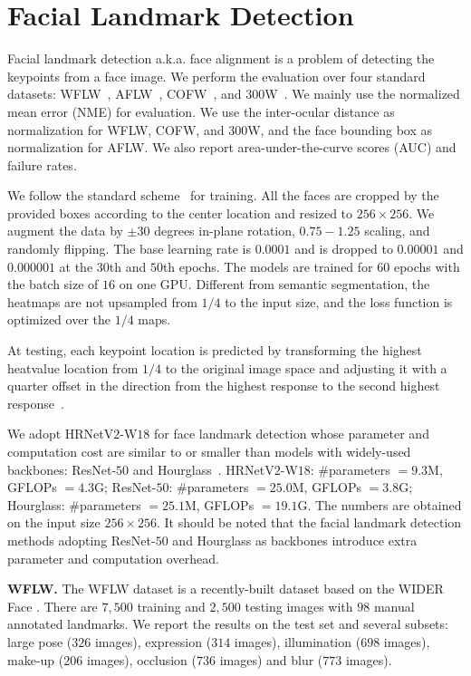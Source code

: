 \documentclass[10pt,journal,compsoc]{IEEEtran}
\begin{document}
\clearpage

\section{Facial Landmark Detection}
Facial landmark detection
a.k.a. face alignment
is a problem of detecting the keypoints
from a face image.
We perform the evaluation over 
four standard datasets:
WFLW~\cite{Wu0YWC018},
AFLW~\cite{KostingerWRB11},
COFW~\cite{Burgos-ArtizzuPD13},
and $300$W~\cite{SagonasTZP13}. 
We mainly use the normalized mean error (NME) for evaluation.
We use the inter-ocular distance as normalization
for WFLW, COFW, and $300$W, and the face bounding box as normalization
for AFLW.
We also report area-under-the-curve scores (AUC) and failure rates. 

We follow the standard scheme~\cite{Wu0YWC018} for training.
All the faces are cropped by the provided boxes according 
to the center location and resized to $256 \times 256$. 
We augment the data by $\pm30$ degrees in-plane rotation,
$0.75-1.25$ scaling, and
randomly flipping. 
The base learning rate is $0.0001$ and is dropped to
$0.00001$ and $0.000001$ at the $30$th and $50$th epochs. The models 
are trained for $60$ epochs with the batch size of $16$ on
one GPU. Different from semantic segmentation,
the heatmaps are not upsampled from $1/4$ to the input size,
and the loss function is optimized over
the $1/4$ maps.

At testing,
each keypoint location is predicted
by transforming the highest heatvalue location from $1/4$
to the original image space
and adjusting it with a quarter offset
in the direction from the highest response
to the second highest response~\cite{ChenSWLY17}.

We adopt HRNetV$2$-W$18$ for face landmark detection
whose parameter and computation cost
are similar to or smaller than 
models with widely-used backbones: ResNet-$50$ and Hourglass~\cite{NewellYD16}.
HRNetV$2$-W$18$: \#parameters $=9.3$M, GFLOPs $=4.3$G;
ResNet-$50$: \#parameters $=25.0$M, GFLOPs $=3.8$G;
Hourglass: \#parameters $=25.1$M, GFLOPs $=19.1$G.
The numbers are obtained on the input size $256 \times 256$.
It should be noted that
the facial landmark detection methods adopting ResNet-$50$ and Hourglass as backbones
introduce extra parameter and computation overhead.

\vspace{.1cm}
\noindent\textbf{WFLW.} 
The WFLW dataset \cite{Wu0YWC018} is a recently-built  
dataset based on the WIDER Face \cite{YangLLT16}. 
There are $7,500$ training and $2,500$ testing images 
with $98$ manual annotated landmarks.
We report the results on the test set and several subsets: 
large pose ($326$ images), expression ($314$ images),
illumination ($698$ images), make-up ($206$ images), occlusion ($736$ images) and blur ($773$
images).
\end{document}
